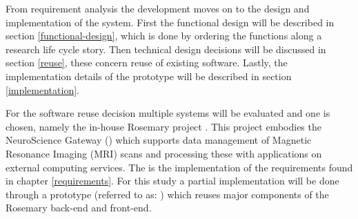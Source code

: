 
From requirement analysis the development moves on to the design and implementation of the system.
First the functional design will be described in section \ref{functional-design}, which is done by ordering the functions along a research life cycle story.
Then technical design decisions will be discussed in section \ref{reuse}, these concern reuse of existing software.
Lastly, the implementation details of the \ivfsystem{} prototype will be described in section \ref{implementation}.

For the software reuse decision multiple systems will be evaluated and one is chosen, namely the in-house Rosemary project \cite{rosemary}.
This project embodies the NeuroScience Gateway (\nsg{}) \cite{shahand2015data} which supports data management of Magnetic Resonance Imaging (MRI) scans and processing these with applications on external computing services.
The \ivfsystem{} is the implementation of the requirements found in chapter \ref{requirements}.
For this study a partial implementation will be done through a prototype (referred to as: \ivfprototype{}) which reuses major components of the Rosemary back-end and front-end.